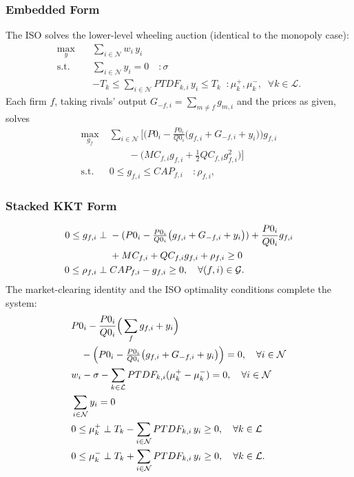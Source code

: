 \documentclass[lettersize,journal]{IEEEtran}
\begin{document}
\subsubsection{Embedded Form}

The ISO solves the lower-level wheeling auction (identical to the monopoly
case):
\begin{equation}
\begin{split}
\max_{y} \quad & \sum_{i \in \mathcal{N}} w_i\, y_i \\
\text{s.t.}\quad & \sum_{i \in \mathcal{N}} y_i = 0 \quad : \sigma \\
& -T_k \le \sum_{i \in \mathcal{N}} PTDF_{k,i}\, y_i \le T_k
   \;\; : \mu_k^{+},\mu_k^{-}, \;\; \forall k \in \mathcal{L}.
\end{split}
\end{equation}
Each firm $f$, taking rivals' output
$G_{-f,i} = \sum_{m \ne f} g_{m,i}$ and the prices as given, solves
\begin{equation}
\begin{split}
\max_{g_f} \;& \sum_{i \in \mathcal{N}}
 \Big[ \Big(P0_i - \tfrac{P0_i}{Q0_i}\big( g_{f,i} + G_{-f,i} + y_i \big)\Big) g_{f,i} \\
& \qquad - \Big( MC_{f,i} g_{f,i} + \tfrac{1}{2} QC_{f,i} g_{f,i}^2 \Big) \Big] \\
\text{s.t.}\;& 0 \le g_{f,i} \le CAP_{f,i} \quad : \rho_{f,i},
\end{split}
\end{equation}

\subsubsection{Stacked KKT Form}

\begin{align}
0 \le g_{f,i} \perp\;& -(P0_i - \tfrac{P0_i}{Q0_i}\big( g_{f,i} + G_{-f,i} + y_i \big)) + \frac{P0_i}{Q0_i} g_{f,i} \notag \\
& + MC_{f,i} + QC_{f,i} g_{f,i} + \rho_{f,i} \ge 0 \\
0 \le \rho_{f,i} \perp\;& CAP_{f,i} - g_{f,i} \ge 0,
   \quad \forall (f,i) \in \mathcal{G}.
\end{align}
The market-clearing identity and the ISO optimality conditions complete the
system:
\begin{align}
& P0_i - \frac{P0_i}{Q0_i}\Big( \sum_{f} g_{f,i} + y_i \Big) \notag \\
& \quad {} - \Big(P0_i - \tfrac{P0_i}{Q0_i}\big( g_{f,i} + G_{-f,i} + y_i \big)\Big)
   = 0, \quad \forall i \in \mathcal{N} \\
& w_i - \sigma - \sum_{k \in \mathcal{L}} PTDF_{k,i}(\mu_k^{+} - \mu_k^{-})
   = 0, \quad \forall i \in \mathcal{N} \\
& \sum_{i \in \mathcal{N}} y_i = 0 \\
& 0 \le \mu_k^{+} \perp T_k - \sum_{i \in \mathcal{N}} PTDF_{k,i}\, y_i \ge 0,
   \quad \forall k \in \mathcal{L} \\
& 0 \le \mu_k^{-} \perp T_k + \sum_{i \in \mathcal{N}} PTDF_{k,i}\, y_i \ge 0,
   \quad \forall k \in \mathcal{L}.
\end{align}
\end{document}
